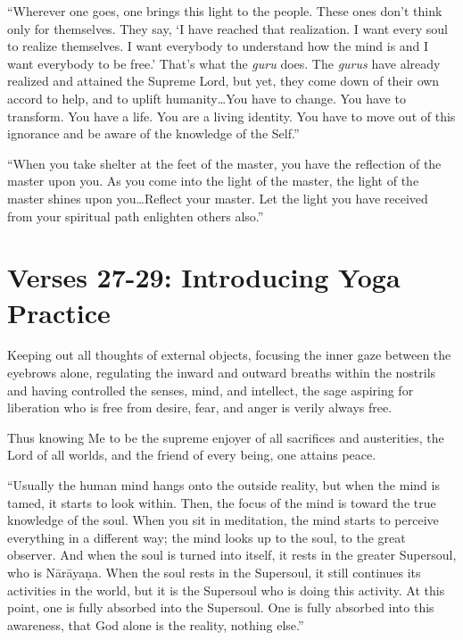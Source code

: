 \enquote{Wherever one goes, one brings this light to the people. These ones don’t think only for themselves. They say, \enquote{I have reached that realization. I want every soul to realize themselves. I want everybody to understand how the mind is and I want everybody to be free.} That’s what the \textit{guru} does. The \textit{gurus} have already realized and attained the Supreme Lord, but yet, they come down of their own accord to help, and to uplift humanity\ldots You have to change. You have to transform. You have a life. You are a living identity. You have to move out of this ignorance and be aware of the knowledge of the Self.}

\enquote{When you take shelter at the feet of the master, you have the reflection of the master upon you. As you come into the light of the master, the light of the master shines upon you\ldots Reflect your master. Let the light you have received from your spiritual path enlighten others also.}

\section{Verses 27-29: Introducing Yoga Practice}\label{sec-verses-27-29-introducing-yoga-practice}

{Keeping out all thoughts of external objects, focusing the inner gaze between the eyebrows alone, regulating the inward and outward breaths within the nostrils and having controlled the senses, mind, and intellect, the sage aspiring for liberation who is free from desire, fear, and anger is verily always free.}

{Thus knowing Me to be the supreme enjoyer of all sacrifices and austerities, the Lord of all worlds, and the friend of every being, one attains peace.}

\enquote{Usually the human mind hangs onto the outside reality, but when the mind is tamed, it starts to look within. Then, the focus of the mind is toward the true knowledge of the soul. When you sit in meditation, the mind starts to perceive everything in a different way; the mind looks up to the soul, to the great observer. And when the soul is turned into itself, it rests in the greater Supersoul, who is Nārāyaṇa. When the soul rests in the Supersoul, it still continues its activities in the world, but it is the Supersoul who is doing this activity. At this point, one is fully absorbed into the Supersoul. One is fully absorbed into this awareness, that God alone is the reality, nothing else.}


